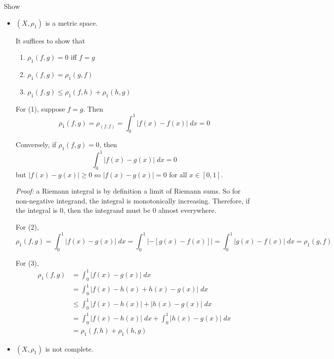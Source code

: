 \documentclass[12pt]{article}
\newcommand{\abs}[1]{\left\vert #1 \right\vert}
\newenvironment*{proof}[1][blue]{
    \begin{tcolorbox}[
        parbox=false,
        colback=#1!5!white,
        colframe=#1!75!black,
        coltext=#1,
        breakable
    ]}
    {\end{tcolorbox}}
\begin{document}
Show 
\begin{itemize}
    \item $(X, \rho_1)$ is a metric space.
    
        \color{blue}
            It suffices to show that 
            \begin{enumerate}
                \item $\rho_1(f, g) = 0$ iff $f = g$ 
                \item $\rho_1(f, g) = \rho_1(g, f)$
                \item $\rho_1(f, g) \leq \rho_1(f, h) + \rho_1(h, g)$
            \end{enumerate}

            For (1), suppose $f = g$. Then 
            \[\rho_1(f, g) = \rho_(f, f) = \int_0^1 \abs{f(x) - f(x)} \; dx = 0\]

            Conversely, if $\rho_1(f, g) = 0$, then
            \[\int_0^1 \abs{f(x) - g(x)} \; dx = 0\]
            but $\abs{f(x) - g(x)} \geq 0$ so $\abs{f(x) - g(x)} = 0$ for all $x \in [0, 1]$. 

           \begin{proof}
                \emph{Proof:} a Riemann integral is by definition a limit of Riemann sums. So for non-negative integrand, the integral is monotonically increasing. Therefore, if the integral is $0$, then the integrand must be $0$ almost everywhere.
           \end{proof}

            For (2), 
            \[\rho_1(f, g) = \int_0^1 \abs{f(x) - g(x)} \; dx = \int_0^1 \abs{-[g(x) - f(x)]} = \int_0^1 \abs{g(x) - f(x)} \; dx = \rho_1(g, f)\]

            For (3), 
            \begin{align*}
                \rho_1(f, g) &= \int_0^1 \abs{f(x) - g(x)} \; dx \\
                &= \int_0^1 \abs{f(x) - h(x) + h(x) - g(x)} \; dx \\
                &\leq \int_0^1 \abs{f(x) - h(x)} + \abs{h(x) - g(x)} \; dx \\
                &= \int_0^1 \abs{f(x) - h(x)} \; dx + \int_0^1 \abs{h(x) - g(x)} \; dx \\
                &= \rho_1(f, h) + \rho_1(h, g)
            \end{align*}
        \color{black}

    \item $(X, \rho_1)$ is not complete.
    

\end{itemize}
\end{document}
